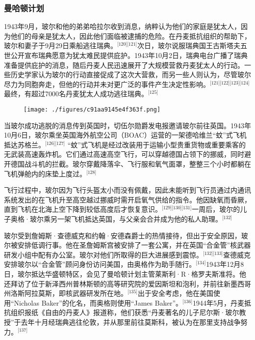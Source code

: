 \subsubsection{曼哈顿计划}
1943年9月，玻尔和他的弟弟哈拉尔收到消息，纳粹认为他们的家庭是犹太人，因为他们的母亲是犹太人，因此他们面临被逮捕的危险。在丹麦抵抗组织的帮助下，玻尔和妻子于9月29日乘船逃往瑞典。\(^\text{[120][121]}\)次日，玻尔说服瑞典国王古斯塔夫五世公开宣布瑞典愿意为犹太难民提供庇护。1943年10月2日，瑞典电台广播了瑞典准备提供庇护的消息，随后丹麦人民迅速展开了大规模营救丹麦犹太人的行动。一些历史学家认为玻尔的行动直接促成了这次大营救，而另一些人则认为，尽管玻尔尽力为同胞奔走，但他的行动并未对更广泛的事件产生决定性影响。\(^\text{[121][122][123][124]}\)最终，有超过7000名丹麦犹太人成功逃往瑞典。\(^\text{[125]}\)
\begin{figure}[ht]
\centering
\texttt{[image: ./figures/c91aa9145e4f363f.png]}
\caption{} \label{fig_NRSbr_10}
\end{figure}
当玻尔成功逃脱的消息传到英国时，切伍尔勋爵发电报邀请玻尔前往英国。1943年10月6日，玻尔乘坐英国海外航空公司（BOAC）运营的一架德哈维兰“蚊”式飞机抵达苏格兰。\(^\text{[126][127]}\) “蚊”式飞机是经过改装用于运输小型贵重货物或重要乘客的无武装高速轰炸机。它们通过高速高空飞行，可以穿越德国占领下的挪威，同时避开德国战斗机的拦截。玻尔穿戴降落伞、飞行服和氧气面罩，整整三个小时都躺在飞机弹舱内的床垫上度过。\(^\text{[128]}\)

飞行过程中，玻尔因为飞行头盔太小而没有佩戴，因此未能听到飞行员通过内通讯系统发出的在飞机升至高空越过挪威时需开启氧气供给的指令。他因缺氧而昏厥，直到飞机在北海上空下降到较低高度后才恢复意识。\(^\text{[129][130][131]}\)一周后，玻尔的儿子奥格·玻尔乘另一架飞机抵达英国，与父亲会合并成为他的私人助理。\(^\text{[132]}\)

玻尔受到詹姆斯·查德威克和约翰·安德森爵士的热情接待，但出于安全原因，玻尔被安排低调行事。他在圣詹姆斯宫被安排了一套公寓，并在英国“合金管”核武器研发小组中配有办公室。玻尔对他们所取得的巨大进展感到震惊。\(^\text{[132][133]}\)查德威克安排玻尔以“合金管”顾问身份访问美国，由奥格作为助手随行。\(^\text{[134]}\)1943年12月8日，玻尔抵达华盛顿特区，会见了曼哈顿计划主管莱斯利·R·格罗夫斯准将。他还拜访了位于新泽西州普林斯顿的高等研究院的爱因斯坦和泡利，并前往新墨西哥州洛斯阿拉莫斯，即核武器研发所在地。\(^\text{[135]}\)出于安全考虑，他在美国使用“Nicholas Baker”的化名，而奥格则使用“James Baker”。\(^\text{[136]}\)1944年5月，丹麦抵抗组织报纸《自由的丹麦人》报道称，他们获悉“丹麦著名的儿子尼尔斯·玻尔教授”于去年十月经瑞典逃往伦敦，并从那里前往莫斯科，被认为在那里支持战争努力。\(^\text{[137]}\)

